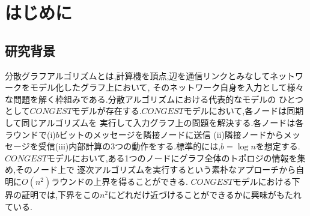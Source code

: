 \documentclass[12pt]{thesis}
\theoremstyle{definition}
\begin{document}
\baselineskip=22pt
\pagestyle{empty}

\maketitle

\pagestyle{myheadings}	%
\tableofcontents

\newpage


\chapter{はじめに}

\section{研究背景}
分散グラフアルゴリズムとは,計算機を頂点,辺を通信リンクとみなしてネットワークをモデル化したグラフ上において,
そのネットワーク自身を入力として様々な問題を解く枠組みである.分散アルゴリズムにおける代表的なモデルの
ひとつとして$CONGEST$モデルが存在する.$CONGEST$モデルにおいて,各ノードは同期して同じアルゴリズムを
実行して入力グラフ上の問題を解決する.各ノードは各ラウンドで(i)$b$ビットのメッセージを隣接ノードに送信
(ii)隣接ノードからメッセージを受信(iii)内部計算の3つの動作をする.標準的には,$b = \log n$を想定する.
$CONGEST$モデルにおいて,ある1つのノードにグラフ全体のトポロジの情報を集め,そのノード上で
逐次アルゴリズムを実行するという素朴なアプローチから自明に$O (n^{2})$ラウンドの上界を得ることができる.
$CONGEST$モデルにおける下界の証明では,下界をこの$n^{2}$にどれだけ近づけることができるかに興味がもたれている.
\end{document}
